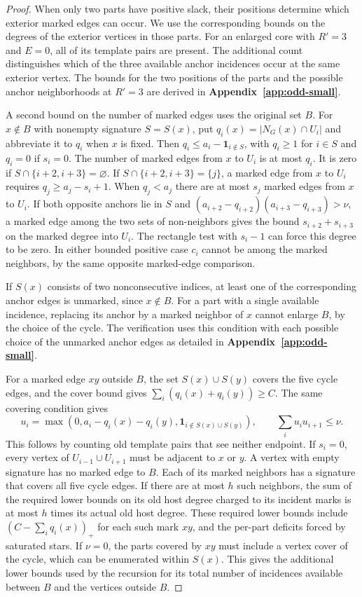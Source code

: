 \documentclass[preprint,11pt,numbers]{elsarticle-arxiv}
\numberwithin{equation}{section}
\theoremstyle{definition}
\begin{document}
\begin{proof}
When only two parts have positive slack, their positions determine
which exterior marked edges can occur. We use the corresponding
bounds on the degrees of the exterior vertices in those parts.
For an enlarged core with $R'=3$ and $E=0$, all of its template
pairs are present. The additional count distinguishes which of the
three available anchor incidences occur at the same exterior vertex.
The bounds for the two positions of the parts and the possible
anchor neighborhoods at $R'=3$ are derived in
\textbf{Appendix~\ref{app:odd-small}}.

A second bound on the number of marked edges uses the original set $B$.
For $x\notin B$ with nonempty signature $S=S(x)$, put
$q_i(x)=|N_G(x)\cap U_i|$ and abbreviate it to $q_i$ when $x$
is fixed. Then $q_i\leq a_i-\mathbf1_{i\notin S}$, with $q_i\geq1$
for $i\in S$ and $q_i=0$ if $s_i=0$. The number of marked edges
from $x$ to $U_i$ is at most $q_i$. It is zero if
$S\cap\{i+2,i+3\}=\varnothing$. If $S\cap\{i+2,i+3\}=\{j\}$,
a marked edge from $x$ to $U_i$ requires $q_j\geq a_j-s_i+1$.
When $q_j<a_j$ there are at most $s_j$ marked edges from $x$ to $U_i$. If both opposite anchors lie in $S$ and
$(a_{i+2}-q_{i+2})(a_{i+3}-q_{i+3})>\nu$, a marked edge among
the two sets of non-neighbors gives the bound $s_{i+2}+s_{i+3}$
on the marked degree into $U_i$. The rectangle test with $s_i-1$
can force this degree to be zero. In either bounded positive case
$c_i$ cannot be among the marked neighbors, by the same opposite
marked-edge comparison.

If $S(x)$ consists of two nonconsecutive indices, at least one
of the corresponding anchor edges is unmarked, since $x\notin B$.
For a part with a single available incidence, replacing its anchor by
a marked neighbor of $x$ cannot enlarge $B$, by the choice of the
cycle. The verification uses this condition with each possible choice
of the unmarked anchor edges as detailed in \textbf{Appendix~\ref{app:odd-small}}.

For a marked edge $xy$ outside $B$, the set $S(x)\cup S(y)$
covers the five cycle edges, and the cover bound gives
$\sum_i(q_i(x)+q_i(y))\ge C$. The same covering condition gives
\[
 u_i=\max(0,a_i-q_i(x)-q_i(y),\mathbf1_{i\notin S(x)\cup S(y)}),
 \qquad \sum_i u_i u_{i+1}\leq \nu.
\]
This follows by counting old template pairs that see neither endpoint.
If $s_i=0$, every vertex of $U_{i-1}\cup U_{i+1}$ must be
adjacent to $x$ or $y$. A vertex with empty signature has no marked
edge to $B$. Each of its marked neighbors has a signature that
covers all five cycle edges. If there are at most $h$ such neighbors, the sum of
the required lower bounds on its old host degree charged to its
incident marks is at most $h$ times its actual old host degree.
These required lower bounds include $(C-\sum_i q_i(x))_+$ for each
such mark $xy$, and the per-part deficits forced by saturated stars.
If $\nu=0$, the parts covered by $xy$ must include a vertex cover of
the cycle, which can be enumerated within $S(x)$. This gives the
additional lower bounds used by the recursion for its total number of incidences available between $B$ and the vertices outside $B$.


\end{proof}
\end{document}
